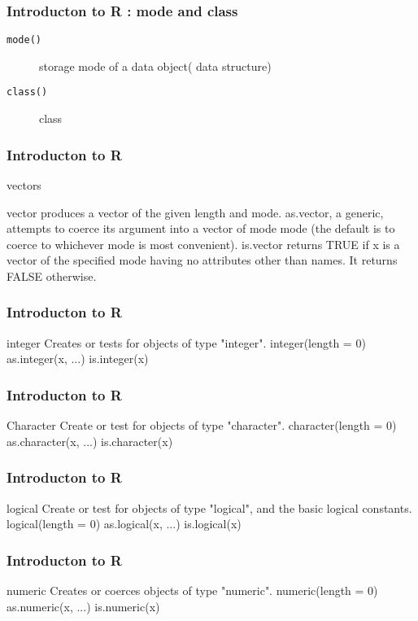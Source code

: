 \documentclass{beamer}
\begin{document}
\begin{frame}[fragile]
\frametitle{Introducton to R : mode and class}

\begin{description}
 \item[\texttt{mode()}]  storage mode of a data object( data structure)
\item[\texttt{class()}] class
\end{description}

\end{frame}
\begin{frame}[fragile]
\frametitle{Introducton to R}


vectors

vector produces a vector of the given length and mode.
as.vector, a generic, attempts to coerce its argument into a vector of mode mode (the default is to coerce to whichever mode is most convenient).
is.vector returns TRUE if x is a vector of the specified mode having no attributes other than names. It returns FALSE otherwise.  
\end{frame}
\begin{frame}[fragile]
\frametitle{Introducton to R}
integer
Creates or tests for objects of type "integer".
integer(length = 0)
as.integer(x, ...)
is.integer(x)

\end{frame}
\begin{frame}[fragile]
\frametitle{Introducton to R}

 Character
Create or test for objects of type "character".
character(length = 0)
as.character(x, ...)
is.character(x)


\end{frame}
\begin{frame}[fragile]
\frametitle{Introducton to R}

logical
Create or test for objects of type "logical", and the basic logical constants.
logical(length = 0)
as.logical(x, ...)
is.logical(x)

\end{frame}
\begin{frame}[fragile]
\frametitle{Introducton to R}

numeric
Creates or coerces objects of type "numeric". 
numeric(length = 0)
as.numeric(x, ...)
is.numeric(x)


\end{frame}
\end{document}
